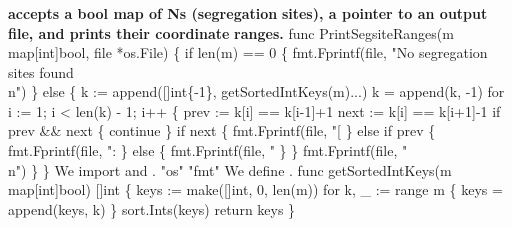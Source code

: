 \subsubsection{}
\textbf{ accepts a bool map of Ns (segregation}
\textbf{sites), a pointer to an output file, and prints their coordinate}
\textbf{ranges.}
\nwenddocs{}\endmoddef\nwstartdeflinemarkup{}\nwenddeflinemarkup
func PrintSegsiteRanges(m map[int]bool, file *os.File) \{
          if len(m) == 0 \{
                  fmt.Fprintf(file, "No segregation sites found\\n")
          \} else \{
                  k := append([]int\{-1\}, getSortedIntKeys(m)...)
                  k = append(k, -1)
                  for i := 1; i < len(k) - 1; i++ \{
                          prev := k[i] == k[i-1]+1
                          next := k[i] == k[i+1]-1
                          if prev && next \{
                                  continue
                          \}
                          if next \{
                                  fmt.Fprintf(file, "[%
                          \} else if prev \{
                                  fmt.Fprintf(file, ":%
                          \} else \{
                                  fmt.Fprintf(file, "%
                          \}
                  \}
                  fmt.Fprintf(file, "\\n")
          \}
\}
\nwendcode{}\nwdocspar
We import  and .
\nwenddocs{}\plusendmoddef\nwstartdeflinemarkup{}\nwenddeflinemarkup
"os"
"fmt"
\nwendcode{}\nwdocspar
We define .
\nwenddocs{}\plusendmoddef\nwstartdeflinemarkup{}\nwenddeflinemarkup
func getSortedIntKeys(m map[int]bool) []int \{
          keys := make([]int, 0, len(m))
          for k, _ := range m \{
                  keys = append(keys, k)
          \}
          sort.Ints(keys)
          return keys
\}
\nwendcode{}\nwdocspar
